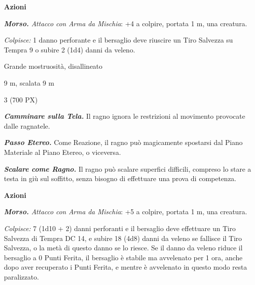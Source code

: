 \begin{multicols}{2}
{\textbf{Azioni}

\emph{\textbf{Morso.} Attacco con Arma da Mischia}: +4 a colpire, portata 1 m, una creatura.

\emph{Colpisce:} 1 danno perforante e il bersaglio deve riuscire un Tiro Salvezza su Tempra 9 o subire 2 (1d4) danni da veleno.

\begin{description}[noitemsep, topsep=0pt, parsep=0pt, partopsep=0pt, itemsep=1pt, leftmargin=2.35cm,  labelwidth=2.2cm, itemindent=0cm, listparindent=0pt] %
\setlength{\baselineskip}{10pt}
\item[\textbf{Taglia/Tipo}] Grande mostruosità, disallineato
\item[\textbf{Caratt.}] 
\item[\textbf{Punti Ferita}] 
\item[\textbf{Tiri Salvez.}] 
\item[\textbf{Movimento}] 9 m, scalata 9 m
\item[\textbf{Sfida}] 3 (700 PX)
\end{description}
\smallskip

\emph{\textbf{Camminare sulla Tela.}} Il ragno ignora le restrizioni al movimento provocate dalle ragnatele.

\emph{\textbf{Passo Etereo.}} Come Reazione, il ragno può magicamente spostarsi dal Piano Materiale al Piano Etereo, o viceversa.

\emph{\textbf{Scalare come Ragno.}} Il ragno può scalare superfici difficili, compreso lo stare a testa in giù sul soffitto, senza bisogno di effettuare una prova di competenza.

\textbf{Azioni}

\emph{\textbf{Morso.} Attacco con Arma da Mischia}: +5 a colpire, portata 1 m, una creatura.

\emph{Colpisce:} 7 (1d10 + 2) danni perforanti e il bersaglio deve effettuare un Tiro Salvezza di Tempra DC 14, e subire 18 (4d8) danni da veleno se fallisce il Tiro Salvezza, o la metà di questo danno se lo riesce. Se il danno da veleno riduce il bersaglio a 0 Punti Ferita, il bersaglio è stabile ma avvelenato per 1 ora, anche dopo aver recuperato i Punti Ferita, e mentre è avvelenato in questo modo resta paralizzato.

}
\end{multicols}
